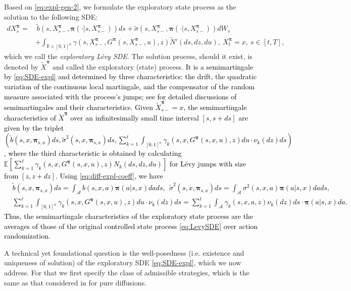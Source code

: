 \documentclass[11pt]{article}
\newcommand{\1}{\mathbbm{1}}
\newcommand{\bpi}{\boldsymbol{\pi}}
\newcommand{\rev}[1]{\textcolor{black}{{#1}}} %
\begin{document}
Based on \eqref{eq:expl-gen-2}, we formulate the exploratory state process as the solution to the following SDE:
\begin{align}
	d X^{\bpi}_s =&\ \tilde{b}(s, X^{\bpi}_{s-}, \bpi(\cdot|s,X^{\bpi}_{s-})) ds + \tilde{\sigma}(s, X^{\bpi}_{s-}, \bpi(\cdot|s,X^{\bpi}_{s-})) dW_s \\
	& + \int_{\mathbb{R}\times[0,1]^n} \gamma\left(s, X^{\bpi}_{s-}, G^{\bpi}(s,X^{\bpi}_{s-},u), z\right) \widetilde N'(ds, dz, du),\ X^{\bpi}_t=x,\ s \in [t, T],\label{eq:SDE-expl}
\end{align}
which we call the {\it exploratory L\'evy SDE}. The solution process, should it exist, is denoted by $\tilde{X}^{\bpi}$ and called the exploratory (state) process. \rev{It is a semimartingale by \eqref{eq:SDE-expl} and determined by three characteristics: the drift, the quadratic variation of the continuous local martingale, and the compensator of the random measure associated with the process's jumps; see \cite{jacod2013limit} for detailed discussions of semimartingales and their characteristics. Given $\tilde{X}_{s-}^{\bpi}=x$, the semimartingale characteristics of $\tilde{X}^{\bpi}$ over an infinitesimally small time interval $[s,s+ds]$ are given by the triplet $(\tilde{b}(s, x, \bpi_{s,x})ds, \tilde{\sigma}^2(s, x, \bpi_{s,x})ds, \sum_{k=1}^{\ell}\int_{[0,1]^n}\gamma_k(s, x, G^{\bpi}(s,x,u), z)du\cdot\nu_k(dz)ds)$, where the third characteristic is obtained by calculating $\mathbb{E}[\sum_{k=1}^\ell\gamma_k\left(s, x, G^{\bpi}(s,x,u), z\right)N_k(ds, dz, du)]$ for L\'evy jumps with size from $[z,z+dz]$. Using \eqref{eq:diff-expl-coeff}, we have
\begin{align}
	&\tilde{b}(s, x, \bpi_{s,x})ds = \int_{\mathcal{A}}b(s,x,a)\bpi(a|s,x)dads,\ \ \tilde{\sigma}^2(s, x, \bpi_{s,x})ds = \int_{\mathcal{A}}\sigma^2(s,x,a)\bpi(a|s,x)dads,\\
	&\sum_{k=1}^\ell\int_{[0,1]^n}\gamma_k(s, x, G^{\bpi}(s,x,u), z)du\cdot\nu_k(dz)ds = \sum_{k=1}^\ell\int_{\mathcal{A}}\gamma_k\left(s, x, a, z\right)\nu_k(dz)ds\cdot\bpi(a|s,x)da.
\end{align}
Thus, the semimartingale characteristics of the exploratory state process are the averages of those of the original controlled state process \eqref{eq:LevySDE} over action randomization.}

A technical yet foundational question is the well-posedness (i.e. existence and uniqueness of solution) of the exploratory SDE \eqref{eq:SDE-expl}, which we now address. For that we first specify the class of admissible strategies, which is the same as that considered in \cite{jia2022q} for pure diffusions.
\end{document}
